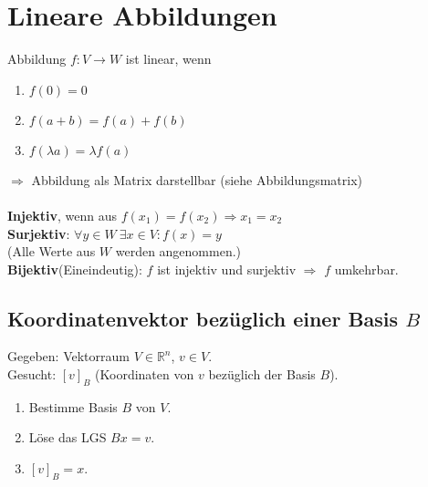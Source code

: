 \documentclass[german, 6pt]{latex4ei/latex4ei_sheet}
\begin{document}
\begin{minipage}{\columnwidth}
\section{Lineare Abbildungen}
Abbildung $f:V\rightarrow W$ ist linear, wenn
\begin{enumerate}\itemsep0pt
\item $f(0)=0$
\item $f(a+b)=f(a)+f(b)$
\item $f(\lambda a)=\lambda f(a)$
\end{enumerate}
$\Rightarrow$ Abbildung als Matrix darstellbar (siehe Abbildungsmatrix)\\ \\
\textbf{Injektiv}, wenn aus $f(x_1)=f(x_2) \Rightarrow x_1=x_2$\\
\textbf{Surjektiv}: $\forall y\in W \ \exists x\in V:f(x)=y$\\ \quad (Alle Werte aus $W$ werden angenommen.)\\
\textbf{Bijektiv}(Eineindeutig): $f$ ist injektiv und surjektiv $\Rightarrow$ $f$ umkehrbar.
\end{minipage}
\subsection{Koordinatenvektor bezüglich einer Basis $B$}
Gegeben: Vektorraum $V \in\mathbb{R}^n$, $v \in V$.\\
Gesucht: $[v]_B$ (Koordinaten von $v$ bezüglich der Basis $B$).
\begin{enumerate}
	\item Bestimme Basis $B$ von $V$.
	\item Löse das LGS $Bx = v$.
	\item $[v]_B = x$.
\end{enumerate}
\end{document}
